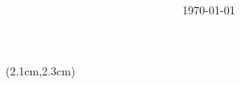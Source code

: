 \begin{preview}

\title{\vspace{-1.5cm} \bfseries{}}

\date{\vspace{-2.4cm} \tiny \today} %

\maketitle

\setcounter{section}{-1}
\setcounter{mypage}{0}

\begin{minipage}{\textwidth}
\setlength{\parskip}{0.4\baselineskip}
\begin{textblock*}{5cm}(2.1cm,2.3cm) %
	{\color{red}{\large \textcircled{\small \themypage}}}
	\addtocounter{mypage}{1}
\end{textblock*}


\end{minipage}
\end{preview}
